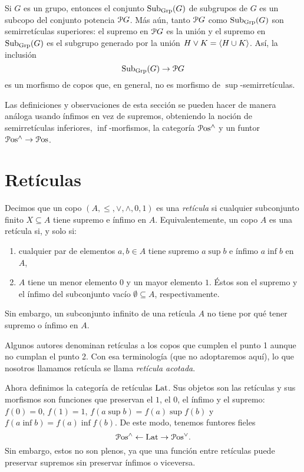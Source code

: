 \begin{example}
  Si $G$ es un grupo, entonces el conjunto $\Sub_\Grp(G)$ de subgrupos
  de $G$ es un subcopo del conjunto potencia $\cal PG$.
  Más aún, tanto $\cal PG$ como $\Sub_\Grp(G)$ son semirretículas
  superiores: el supremo en $\cal PG$ es la unión y el supremo en
  $\Sub_\Grp(G)$ es el subgrupo generado por la unión $H\sup K=\<H\cup
  K\>$. Así, la inclusión
  \begin{equation}
    \Sub_\Grp(G) \to \cal PG
  \end{equation}
  es un morfismo de copos que, en general, no es morfismo de
  $\sup$-semirretículas.
\end{example}

Las definiciones y observaciones de esta sección se pueden hacer
de manera análoga usando ínfimos en vez de supremos, obteniendo
la noción de semirretículas inferiores, $\inf$-morfismos, la
categoría $\Pos^{\inf}$ y un funtor $\Pos^{\inf}\to\Pos$.

\section{Retículas}\label{ret}

Decimos que un copo $(A,\leq,\vee,\wedge,0,1)$ es una \emph{ retícula } si cualquier
subconjunto finito $X\subseteq A$ tiene supremo e ínfimo en $A$.
Equivalentemente, un copo $A$ es una retícula si, y solo si:
\begin{enumerate}
    \item
      cualquier par de elementos $a,b\in A$ tiene supremo $a\sup b$ e
      ínfimo $a\inf b$ en $A$,
    \item
      $A$ tiene un menor elemento $0$ y un mayor elemento $1$.
      Éstos son el supremo y el ínfimo del subconjunto vacío
      $\emptyset\subseteq A$, respectivamente.
\end{enumerate}
Sin embargo, un subconjunto infinito de una retícula $A$
no tiene por qué tener supremo o ínfimo en $A$.

Algunos autores denominan retículas a los copos que
cumplen el punto 1 aunque no cumplan el punto 2.
Con esa terminología (que no adoptaremos aquí), lo que nosotros
llamamos retícula se llama \emph{retícula acotada}.

Ahora definimos la categoría de retículas $\Lat$.
Sus objetos son las retículas y sus
morfismos son funciones que preservan el $1$, el $0$,
el ínfimo y el supremo: $f(0)=0$, $f(1)=1$,
$f(a\sup b)=f(a)\sup f(b)$ y $f(a\inf b)=f(a)\inf f(b)$.
De este modo, tenemos funtores fieles
\begin{equation}
  \Pos^{\inf}\from\Lat\to\Pos^{\sup}.
\end{equation}
Sin embargo, estos no son plenos, ya que una función entre retículas
puede preservar supremos sin preservar ínfimos o viceversa.

